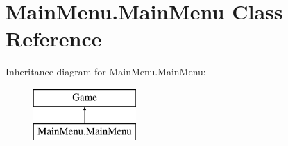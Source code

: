 \hypertarget{class_main_menu_1_1_main_menu}{\section{Main\-Menu.\-Main\-Menu Class Reference}
\label{class_main_menu_1_1_main_menu}
}
Inheritance diagram for Main\-Menu.\-Main\-Menu\-:\begin{figure}[H]
\begin{center}
\leavevmode
\includegraphics[height=2.000000cm]{class_main_menu_1_1_main_menu}
\end{center}
\end{figure}
